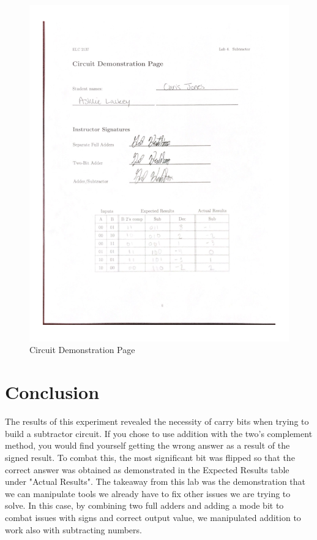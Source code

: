 \documentclass[11pt]{article}
\begin{document}
\begin{figure}
	\includegraphics[width=1.0\textwidth]{"Demonstration"}
	\caption{Circuit Demonstration Page}
\end{figure}

\clearpage
\section*{Conclusion}
The results of this experiment revealed the necessity of carry bits when trying to build a subtractor circuit. If you chose to use addition with the two's complement method, you would find yourself getting the wrong answer as a result of the signed result. To combat this, the most significant bit was flipped so that the correct answer was obtained as demonstrated in the Expected Results table under "Actual Results". The takeaway from this lab was the demonstration that we can manipulate tools we already have to fix other issues we are trying to solve. In this case, by combining two full adders and adding a mode bit to combat issues with signs and correct output value, we manipulated addition to work also with subtracting numbers.
\end{document}
